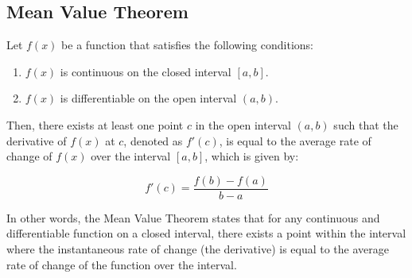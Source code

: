 \documentclass[11pt]{article}
\begin{document}
\subsection{Mean Value Theorem}
Let \(f(x)\) be a function that satisfies the following conditions:

\begin{enumerate}
  \item \(f(x)\) is continuous on the closed interval \([a, b]\).
  \item \(f(x)\) is differentiable on the open interval \((a, b)\).
\end{enumerate}

Then, there exists at least one point \(c\) in the open interval \((a, b)\) such that the derivative of \(f(x)\) at \(c\), denoted as \(f'(c)\), is equal to the average rate of change of \(f(x)\) over the interval \([a, b]\), which is given by:

\[
f'(c) = \frac{{f(b) - f(a)}}{{b - a}}
\]

In other words, the Mean Value Theorem states that for any continuous and differentiable function on a closed interval, there exists a point within the interval where the instantaneous rate of change (the derivative) is equal to the average rate of change of the function over the interval.
\end{document}
